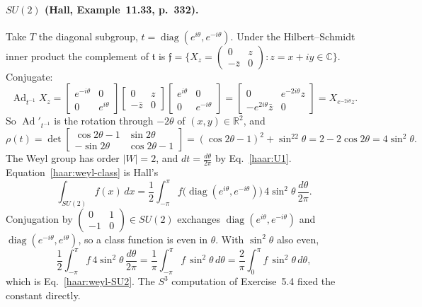 \paragraph{$SU(2)$ (Hall, Example~11.33, p.~332).} Take $T$ the diagonal
subgroup, $t=\operatorname{diag}(e^{i\theta},e^{-i\theta})$. Under the
Hilbert--Schmidt inner product the complement of $\mathfrak t$ is
$\mathfrak f=\{X_z=\left(\begin{smallmatrix}0&z\\-\bar z&0\end{smallmatrix}\right):
z=x+iy\in\mathbb C\}$. Conjugate:
\begin{equation}
 \operatorname{Ad}_{t^{-1}}X_z=\begin{bmatrix}e^{-i\theta}&0\\0&e^{i\theta}\end{bmatrix}
 \begin{bmatrix}0&z\\-\bar z&0\end{bmatrix}
 \begin{bmatrix}e^{i\theta}&0\\0&e^{-i\theta}\end{bmatrix}
 =\begin{bmatrix}0&e^{-2i\theta}z\\-e^{2i\theta}\bar z&0\end{bmatrix}
 =X_{e^{-2i\theta}z}.
\end{equation}
So $\operatorname{Ad}'_{t^{-1}}$ is the rotation through $-2\theta$ of
$(x,y)\in\mathbb R^2$, and
\begin{equation}\label{haar:rho-SU2}
 \rho(t)=\det\begin{bmatrix}\cos2\theta-1&\sin2\theta\\-\sin2\theta&\cos2\theta-1\end{bmatrix}
 =(\cos2\theta-1)^2+\sin^22\theta=2-2\cos2\theta=4\sin^2\theta .
\end{equation}
The Weyl group has order $|W|=2$, and $dt=\frac{d\theta}{2\pi}$ by
Eq.~\eqref{haar:U1}. Equation~\eqref{haar:weyl-class} is Hall's
\begin{equation}\label{haar:hall-11-16}
 \int_{SU(2)}f(x)\,dx=\frac12\int_{-\pi}^{\pi}f\big(\operatorname{diag}(e^{i\theta},e^{-i\theta})\big)
 \,4\sin^2\theta\,\frac{d\theta}{2\pi}.
\end{equation}
Conjugation by $\left(\begin{smallmatrix}0&1\\-1&0\end{smallmatrix}\right)\in SU(2)$
exchanges $\operatorname{diag}(e^{i\theta},e^{-i\theta})$ and
$\operatorname{diag}(e^{-i\theta},e^{i\theta})$, so a class function is even
in $\theta$. With $\sin^2\theta$ also even,
\begin{equation}
 \frac12\int_{-\pi}^{\pi}f\,4\sin^2\theta\,\frac{d\theta}{2\pi}
 =\frac1\pi\int_{-\pi}^{\pi}f\,\sin^2\theta\,d\theta
 =\frac2\pi\int_0^\pi f\,\sin^2\theta\,d\theta ,
\end{equation}
which is Eq.~\eqref{haar:weyl-SU2}. The $S^3$ computation of Exercise~5.4
fixed the constant directly.

